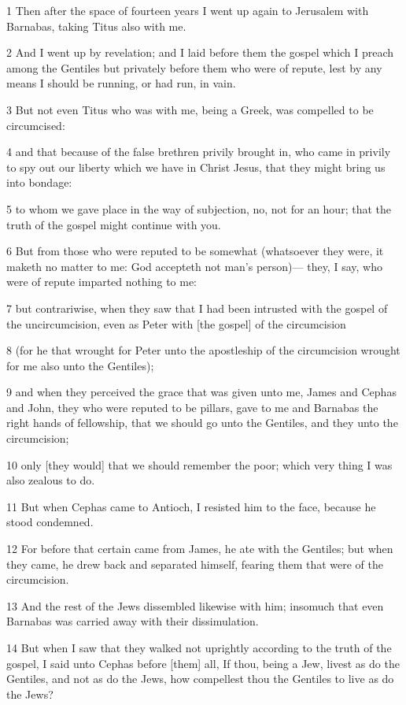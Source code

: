 \par 1 Then after the space of fourteen years I went up again to Jerusalem with Barnabas, taking Titus also with me.
\par 2 And I went up by revelation; and I laid before them the gospel which I preach among the Gentiles but privately before them who were of repute, lest by any means I should be running, or had run, in vain.
\par 3 But not even Titus who was with me, being a Greek, was compelled to be circumcised:
\par 4 and that because of the false brethren privily brought in, who came in privily to spy out our liberty which we have in Christ Jesus, that they might bring us into bondage:
\par 5 to whom we gave place in the way of subjection, no, not for an hour; that the truth of the gospel might continue with you.
\par 6 But from those who were reputed to be somewhat (whatsoever they were, it maketh no matter to me: God accepteth not man's person)— they, I say, who were of repute imparted nothing to me:
\par 7 but contrariwise, when they saw that I had been intrusted with the gospel of the uncircumcision, even as Peter with [the gospel] of the circumcision
\par 8 (for he that wrought for Peter unto the apostleship of the circumcision wrought for me also unto the Gentiles);
\par 9 and when they perceived the grace that was given unto me, James and Cephas and John, they who were reputed to be pillars, gave to me and Barnabas the right hands of fellowship, that we should go unto the Gentiles, and they unto the circumcision;
\par 10 only [they would] that we should remember the poor; which very thing I was also zealous to do.
\par 11 But when Cephas came to Antioch, I resisted him to the face, because he stood condemned.
\par 12 For before that certain came from James, he ate with the Gentiles; but when they came, he drew back and separated himself, fearing them that were of the circumcision.
\par 13 And the rest of the Jews dissembled likewise with him; insomuch that even Barnabas was carried away with their dissimulation.
\par 14 But when I saw that they walked not uprightly according to the truth of the gospel, I said unto Cephas before [them] all, If thou, being a Jew, livest as do the Gentiles, and not as do the Jews, how compellest thou the Gentiles to live as do the Jews?
